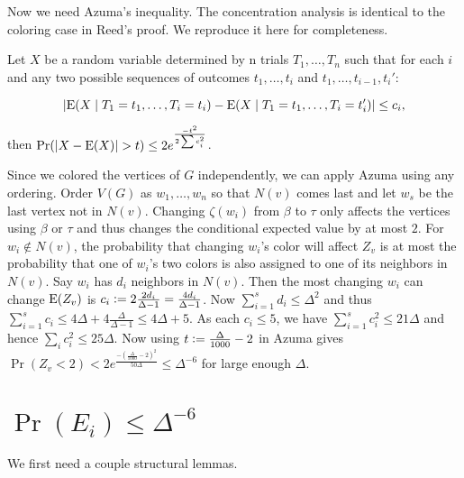 Now we need Azuma's inequality.  The concentration analysis is
identical to the coloring case in Reed's proof.  We reproduce it here for
completeness.

\begin{lem}[Azuma]
Let $X$ be a random variable determined by n trials $T_1, \ldots, T_n$ such that
for each $i$ and any two possible sequences of outcomes $t_1, \ldots, t_i$ and
$t_1, \ldots, t_{i-1}, t_i'$:

\[\left|\operatorname{E}(X \mid T_1 = t_1, \ldots, T_i = t_i) - \operatorname{E}(X \mid T_1 = t_1,
\ldots, T_i = t_i')\right| \leq c_i,\]

\noindent then $\Pr(\left|X - \operatorname{E}(X)\right| > t) \leq 2e^{\frac{-t^2}{2\sum c_i^2}}$.
\end{lem}

Since we colored the vertices of $G$ independently, we can apply Azuma using any
ordering.  Order $V(G)$ as $w_1, \ldots, w_n$ so that $N(v)$ comes last and let
$w_s$ be the last vertex not in $N(v)$.  Changing $\zeta(w_i)$ from $\beta$ to
$\tau$ only affects the vertices using $\beta$ or $\tau$ and thus changes the
conditional expected value by at most $2$.  For $w_i \not \in N(v)$, the
probability that changing $w_i$'s color will affect $Z_v$ is at most the probability that one of
$w_i$'s two colors is also assigned to one of its neighbors in $N(v)$.  Say
$w_i$ has $d_i$ neighbors in $N(v)$.  Then the most changing $w_i$ can change
$\operatorname{E}(Z_v)$ is $c_i \mathrel{\mathop:}= 2\frac{2d_i}{\Delta-1} = \frac{4d_i}{\Delta-1}$. 
Now $\sum_{i=1}^s d_i \leq \Delta^2$ and thus $\sum_{i=1}^s c_i \leq 4\Delta + 4
\frac{\Delta}{\Delta-1} \leq 4\Delta + 5$.  As each $c_i \leq 5$, we have
$\sum_{i=1}^s c_i^2 \leq 21\Delta$ and hence $\sum_i c_i^2 \leq 25\Delta$.  Now
using $t \mathrel{\mathop:}= \frac{\Delta}{1000} - 2$ in Azuma gives $\Pr(Z_v < 2) <
2e^{\frac{-(\frac{\Delta}{1000} - 2)^2}{50\Delta}} \leq \Delta^{-6}$ for large
enough $\Delta$.

\section{\texorpdfstring{$\Pr(E_i) \leq \Delta^{-6}$}{The E events}}
We first need a couple structural lemmas.

